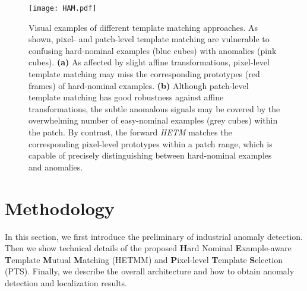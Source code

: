 \documentclass[default,iicol]{sn-jnl}\usepackage[algo2e,ruled,linesnumbered]{algorithm2e}
\theoremstyle{thmstyleone}\newtheorem{theorem}{Theorem}\newtheorem{proposition}[theorem]{Proposition}
\theoremstyle{thmstyletwo}\newtheorem{example}{Example}\newtheorem{remark}{Remark}
\theoremstyle{thmstylethree}\newtheorem{definition}{Definition}
\begin{document}
\begin{figure*}[!t]
    \centering
    \texttt{[image: HAM.pdf]}
    \caption{
        Visual examples of different template matching approaches.
        As shown, pixel- and patch-level template matching are vulnerable to confusing hard-nominal examples (blue cubes) with anomalies (pink cubes).
        \textbf{(a)} As affected by slight affine transformations, pixel-level template matching may miss the corresponding prototypes (red frames) of hard-nominal examples.
        \textbf{(b)} Although patch-level template matching has good robustness against affine transformations, the subtle anomalous signals may be covered by the overwhelming number of easy-nominal examples (grey cubes) within the patch.
        By contrast, the forward \textit{HETM} matches the corresponding pixel-level prototypes within a patch range, which is capable of precisely distinguishing between hard-nominal examples and anomalies.
    }
    \label{fig:HAM}
\end{figure*}

\section{Methodology}
In this section, we first introduce the preliminary of industrial anomaly detection.
Then we show technical details of the proposed \textbf{H}ard Nominal \textbf{E}xample-aware \textbf{T}emplate \textbf{M}utual \textbf{M}atching (HETMM) and \textbf{P}ixel-level \textbf{T}emplate \textbf{S}election (PTS).
Finally, we describe the overall architecture and how to obtain anomaly detection and localization results.
\end{document}
